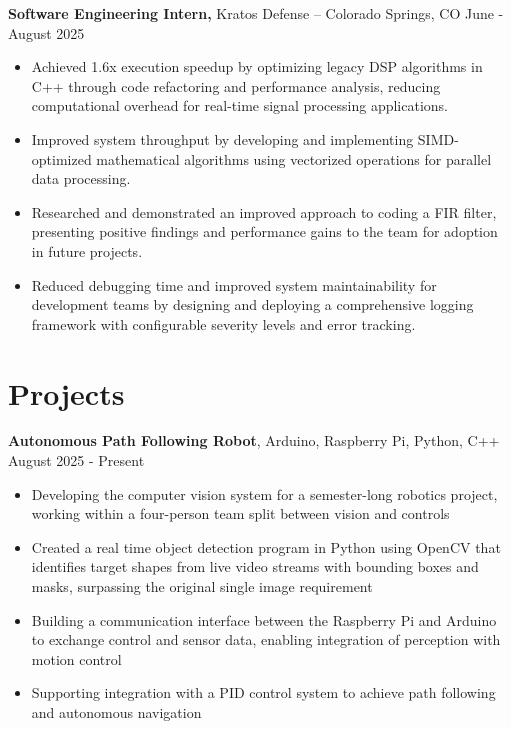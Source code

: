 \documentclass[11pt]{article}
\begin{document}
\textbf{Software Engineering Intern, }{Kratos Defense} -- Colorado Springs, CO \hfill June - August 2025 \\
\begin{itemize}
  \item Achieved 1.6x execution speedup by optimizing legacy DSP algorithms in C++ through code refactoring and performance analysis, reducing computational overhead for real-time signal processing applications.
  \item Improved system throughput by developing and implementing SIMD-optimized mathematical algorithms using vectorized operations for parallel data processing.
  \item Researched and demonstrated an improved approach to coding a FIR filter, presenting positive findings and performance gains to the team for adoption in future projects.
  \item Reduced debugging time and improved system maintainability for development teams by designing and deploying a comprehensive logging framework with configurable severity levels and error tracking.
\end{itemize}

\section*{Projects}

\textbf{Autonomous Path Following Robot}, Arduino, Raspberry Pi, Python, C++  \hfill August 2025 - Present
\begin{itemize}
  \item Developing the computer vision system for a semester-long robotics project, working within a four-person team split between vision and controls
  \item Created a real time object detection program in Python using OpenCV that identifies target shapes from live video streams with bounding boxes and masks, surpassing the original single image requirement
  \item Building a communication interface between the Raspberry Pi and Arduino to exchange control and sensor data, enabling integration of perception with motion control
  \item Supporting integration with a PID control system to achieve path following and autonomous navigation
\end{itemize}

\vspace{6pt}
\end{document}
